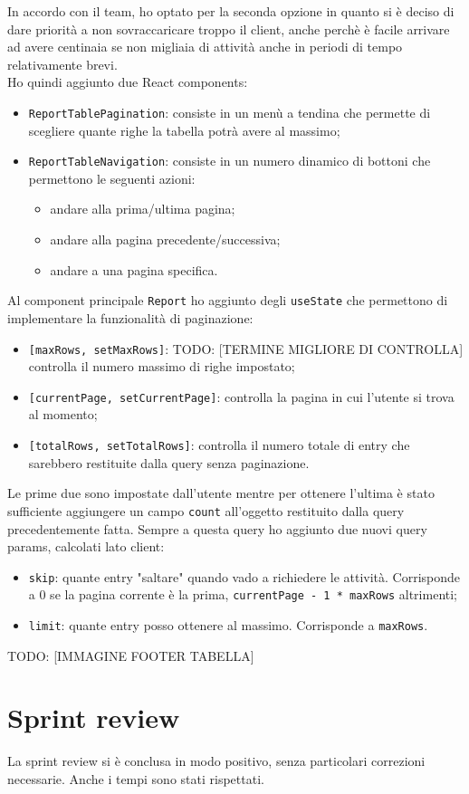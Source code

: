In accordo con il team, ho optato per la seconda opzione in quanto si è deciso di dare priorità a non sovraccaricare troppo il client, anche perchè è facile arrivare ad avere centinaia se non migliaia di attività anche in periodi di tempo relativamente brevi. \\
Ho quindi aggiunto due React components:
\begin{itemize}
  \item \texttt{ReportTablePagination}: consiste in un menù a tendina che permette di scegliere quante righe la tabella potrà avere al massimo;
  \item \texttt{ReportTableNavigation}: consiste in un numero dinamico di bottoni che permettono le seguenti azioni:
  \begin{itemize}
    \item andare alla prima/ultima pagina;
    \item andare alla pagina precedente/successiva;
    \item andare a una pagina specifica.
  \end{itemize}
\end{itemize}

Al component principale \texttt{Report} ho aggiunto degli \texttt{useState} che permettono di implementare la funzionalità di paginazione:
\begin{itemize}
  \item \texttt{[maxRows, setMaxRows]}: TODO: [TERMINE MIGLIORE DI CONTROLLA] controlla il numero massimo di righe impostato;
  \item \texttt{[currentPage, setCurrentPage]}: controlla la pagina in cui l'utente si trova al momento;
  \item \texttt{[totalRows, setTotalRows]}: controlla il numero totale di entry che sarebbero restituite dalla query senza paginazione.
\end{itemize}
Le prime due sono impostate dall'utente mentre per ottenere l'ultima è stato sufficiente aggiungere un campo \texttt{count} all'oggetto restituito dalla query precedentemente fatta. Sempre a questa query ho aggiunto due nuovi query params, calcolati lato client:
\begin{itemize}
  \item \texttt{skip}: quante entry "saltare" quando vado a richiedere le attività. Corrisponde a 0 se la pagina corrente è la prima, \texttt{currentPage - 1 * maxRows} altrimenti;
  \item \texttt{limit}: quante entry posso ottenere al massimo. Corrisponde a \texttt{maxRows}.
\end{itemize}

TODO: [IMMAGINE FOOTER TABELLA]

\section{Sprint review}
La sprint review si è conclusa in modo positivo, senza particolari correzioni necessarie. Anche i tempi sono stati rispettati.
